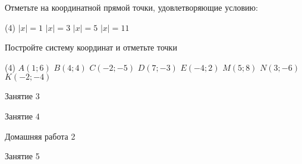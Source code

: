 \begin{homework}[number=1]
\begin{listofex}
		\item Отметьте на координатной прямой точки, удовлетворяющие условию:
		\begin{tasks}(4)
			\task \( |x|=1 \)
			\task \( |x|=3 \)
			\task \( |x|=5 \)
			\task \( |x|=11 \)
		\end{tasks}
		\item Постройте систему координат и отметьте точки
		\begin{tasks}(4)
			\task \( A(1;6) \)
			\task \( B(4;4) \)
			\task \( C(-2;-5) \)
			\task \( D(7;-3) \)
			\task \( E(-4;2) \)
			\task \( M(5;8) \)
			\task \( N(3;-6) \)
			\task \( K(-2;-4) \)
		\end{tasks}
	\end{listofex}
\end{homework}

\begin{class}[number=3]
	\begin{listofex}
		\item Занятие 3 
	\end{listofex}
\end{class}

\begin{class}[number=4]
	\begin{listofex}
		\item Занятие 4
	\end{listofex}
\end{class}

\begin{homework}[number=2]
	\begin{listofex}
		\item Домашняя работа 2
	\end{listofex}
\end{homework}

\begin{class}[number=5]
	\begin{listofex}
		\item Занятие 5
	\end{listofex}
\end{class}

